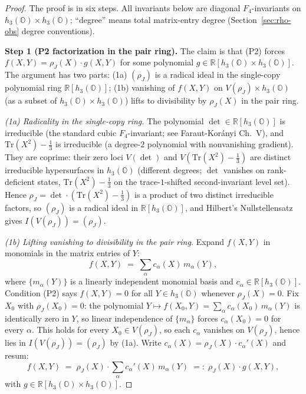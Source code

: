 \documentclass[12pt]{article}
\theoremstyle{remark}
\newcommand{\hthree}{h_3(\mathbb{O})}
\newcommand{\Ffour}{F_4}
\newcommand{\rhoJ}{\rho_J}
\newcommand{\Tr}{\mathrm{Tr}}
\begin{document}
\begin{proof}
The proof is in six steps. All invariants below are diagonal
$\Ffour$-invariants on $\hthree \times \hthree$; ``degree''
means total matrix-entry degree (Section~\ref{sec:rho-obs} degree
conventions).

\textbf{Step 1 (P2 factorization in the pair ring).} The claim is
that (P2) forces $f(X, Y) = \rhoJ(X) \cdot g(X, Y)$ for some
polynomial $g \in \mathbb{R}[\hthree \times \hthree]$. The
argument has two parts: (1a) $(\rhoJ)$ is a radical ideal in the
single-copy polynomial ring $\mathbb{R}[\hthree]$; (1b) vanishing
of $f(X, Y)$ on $V(\rhoJ) \times \hthree$ (as a subset of
$\hthree \times \hthree$) lifts to divisibility by $\rhoJ(X)$ in
the pair ring.

\emph{(1a) Radicality in the single-copy ring.} The polynomial
$\det \in \mathbb{R}[\hthree]$ is irreducible (the standard cubic
$\Ffour$-invariant; see Faraut-Kor\'anyi Ch.~V), and
$\Tr(X^2) - \tfrac{1}{3}$ is irreducible (a degree-$2$ polynomial
with nonvanishing gradient). They are coprime: their zero loci
$V(\det)$ and $V(\Tr(X^2) - \tfrac{1}{3})$ are distinct irreducible
hypersurfaces in $\hthree$ (different degrees; $\det$ vanishes on
rank-deficient states, $\Tr(X^2) - \tfrac{1}{3}$ on the
trace-$1$-shifted second-invariant level set). Hence $\rhoJ =
\det \cdot (\Tr(X^2) - \tfrac{1}{3})$ is a product of two distinct
irreducible factors, so $(\rhoJ)$ is a radical ideal in
$\mathbb{R}[\hthree]$, and Hilbert's Nullstellensatz gives
$I(V(\rhoJ)) = (\rhoJ)$.

\emph{(1b) Lifting vanishing to divisibility in the pair ring.}
Expand $f(X, Y)$ in monomials in the matrix entries of $Y$:
\[
  f(X, Y) \;=\; \sum_{\alpha} c_\alpha(X) \, m_\alpha(Y),
\]
where $\{m_\alpha(Y)\}$ is a linearly independent monomial basis
and $c_\alpha \in \mathbb{R}[\hthree]$. Condition (P2) says
$f(X, Y) = 0$ for all $Y \in \hthree$ whenever $\rhoJ(X) = 0$. Fix
$X_0$ with $\rhoJ(X_0) = 0$: the polynomial
$Y \mapsto f(X_0, Y) = \sum_\alpha c_\alpha(X_0) \, m_\alpha(Y)$
is identically zero in $Y$, so linear independence of
$\{m_\alpha\}$ forces $c_\alpha(X_0) = 0$ for every $\alpha$. This
holds for every $X_0 \in V(\rhoJ)$, so each $c_\alpha$ vanishes on
$V(\rhoJ)$, hence lies in $I(V(\rhoJ)) = (\rhoJ)$ by (1a). Write
$c_\alpha(X) = \rhoJ(X) \cdot c_\alpha'(X)$ and resum:
\[
  f(X, Y) \;=\; \rhoJ(X) \cdot \sum_\alpha c_\alpha'(X) \, m_\alpha(Y)
  \;=:\; \rhoJ(X) \cdot g(X, Y),
\]
with $g \in \mathbb{R}[\hthree \times \hthree]$.


\end{proof}
\end{document}
